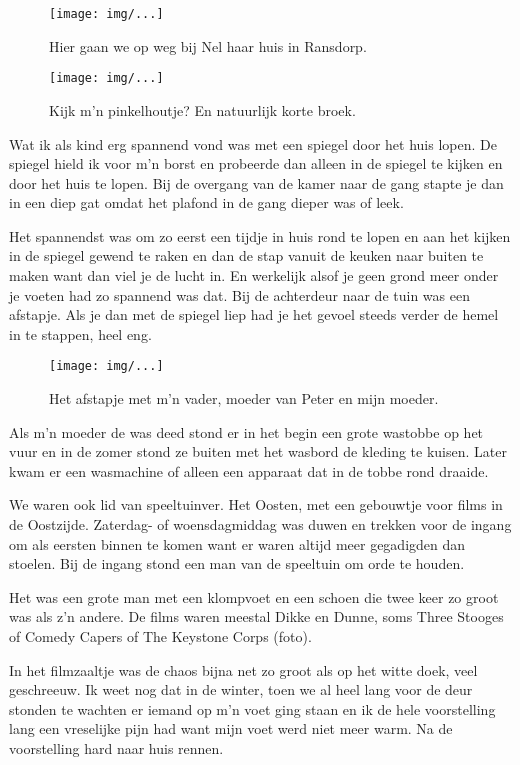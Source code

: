 \documentclass[10pt,twoside,openright]{memoir}
\begin{document}
\begin{figure}[t]
\texttt{[image: img/...]}
\caption{Hier gaan we op weg bij Nel haar huis in Ransdorp.}
\end{figure}

\begin{figure}[t]
\texttt{[image: img/...]}
\caption{Kijk m’n pinkelhoutje? En natuurlijk korte broek.}
\end{figure}

Wat ik als kind erg spannend vond was met een spiegel door het huis lopen. De spiegel hield ik voor m’n borst en probeerde dan alleen in de spiegel te kijken en door het huis te lopen. Bij de overgang van de kamer naar de gang stapte je dan in een diep gat omdat het plafond in de gang dieper was of leek. 

Het spannendst was om zo eerst een tijdje in huis rond te lopen en aan het kijken in de spiegel gewend te raken en dan de stap vanuit de keuken naar buiten te maken want dan viel je de lucht in. En werkelijk alsof je geen grond meer onder je voeten had zo spannend was dat. Bij de achterdeur naar de tuin was een afstapje. Als je dan met de spiegel liep had je het gevoel steeds verder de hemel in te stappen, heel eng. 

\begin{figure}[t]
\texttt{[image: img/...]}
\caption{Het afstapje met m’n vader, moeder van Peter en mijn moeder.}
\end{figure}

Als m’n moeder de was deed stond er in het begin een grote wastobbe op het vuur en in de zomer stond ze buiten met het wasbord de kleding te kuisen. Later kwam er een wasmachine of alleen een apparaat dat in de tobbe rond draaide. 

We waren ook lid van speeltuinver. Het Oosten, met een gebouwtje voor films in de Oostzijde. Zaterdag- of woensdagmiddag was duwen en trekken voor de ingang om als eersten binnen te komen want er waren altijd meer gegadigden dan stoelen. Bij de ingang stond een man van de speeltuin om orde te houden. 

Het was een grote man met een klompvoet en een schoen die twee keer zo groot was als z’n andere. De films waren meestal Dikke en Dunne, soms Three Stooges of Comedy Capers of The Keystone Corps (foto). 

In het filmzaaltje was de chaos bijna net zo groot als op het witte doek, veel geschreeuw. Ik weet nog dat in de winter, toen we al heel lang voor de deur stonden te wachten er iemand op m’n voet ging staan en ik de hele voorstelling lang een vreselijke pijn had want mijn voet werd niet meer warm. Na de voorstelling hard naar huis rennen.
\end{document}
